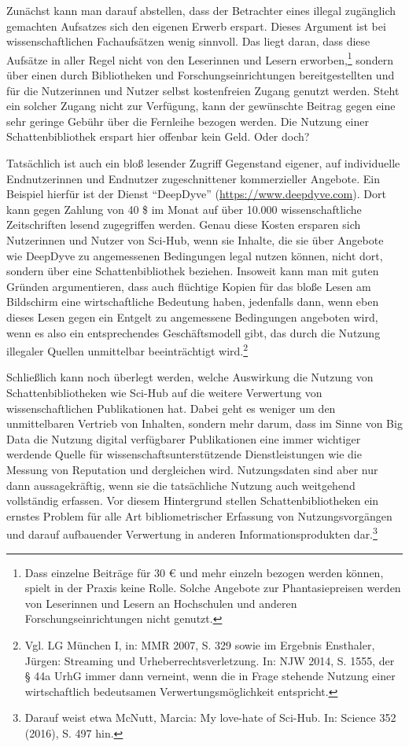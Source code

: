 \documentclass[a4paper,
fontsize=11pt,
oneside,
numbers=noperiodatend,
parskip=half-,
bibliography=totoc,
final
]{scrartcl}
\begin{document}
Zunächst kann man darauf abstellen, dass der Betrachter eines illegal
zugänglich gemachten Aufsatzes sich den eigenen Erwerb erspart. Dieses
Argument ist bei wissenschaftlichen Fachaufsätzen wenig sinnvoll. Das
liegt daran, dass diese Aufsätze in aller Regel nicht von den Leserinnen
und Lesern erworben,\footnote{Dass einzelne Beiträge für 30 \euro{} und
  mehr einzeln bezogen werden können, spielt in der Praxis keine Rolle.
  Solche Angebote zur Phantasiepreisen werden von Leserinnen und Lesern
  an Hochschulen und anderen Forschungseinrichtungen nicht genutzt.}
sondern über einen durch Bibliotheken und Forschungseinrichtungen
bereitgestellten und für die Nutzerinnen und Nutzer selbst kostenfreien
Zugang genutzt werden. Steht ein solcher Zugang nicht zur Verfügung,
kann der gewünschte Beitrag gegen eine sehr geringe Gebühr über die
Fernleihe bezogen werden. Die Nutzung einer Schattenbibliothek erspart
hier offenbar kein Geld. Oder doch?

Tatsächlich ist auch ein bloß lesender Zugriff Gegenstand eigener, auf
individuelle Endnutzerinnen und Endnutzer zugeschnittener kommerzieller
Angebote. Ein Beispiel hierfür ist der Dienst \enquote{DeepDyve}
(\url{https://www.deepdyve.com}). Dort kann gegen Zahlung von 40 \$ im
Monat auf über 10.000 wissenschaftliche Zeitschriften lesend zugegriffen
werden. Genau diese Kosten ersparen sich Nutzerinnen und Nutzer von
Sci-Hub, wenn sie Inhalte, die sie über Angebote wie DeepDyve zu
angemessenen Bedingungen legal nutzen können, nicht dort, sondern über
eine Schattenbibliothek beziehen. Insoweit kann man mit guten Gründen
argumentieren, dass auch flüchtige Kopien für das bloße Lesen am
Bildschirm eine wirtschaftliche Bedeutung haben, jedenfalls dann, wenn
eben dieses Lesen gegen ein Entgelt zu angemessene Bedingungen angeboten
wird, wenn es also ein entsprechendes Geschäftsmodell gibt, das durch
die Nutzung illegaler Quellen unmittelbar beeinträchtigt wird.\footnote{Vgl.
  LG München I, in: MMR 2007, S. 329 sowie im Ergebnis Ensthaler,
  Jürgen: Streaming und Urheberrechtsverletzung. In: NJW 2014, S. 1555,
  der § 44a UrhG immer dann verneint, wenn die in Frage stehende Nutzung
  einer wirtschaftlich bedeutsamen Verwertungsmöglichkeit entspricht.}

Schließlich kann noch überlegt werden, welche Auswirkung die Nutzung von
Schattenbibliotheken wie Sci-Hub auf die weitere Verwertung von
wissenschaftlichen Publikationen hat. Dabei geht es weniger um den
unmittelbaren Vertrieb von Inhalten, sondern mehr darum, dass im Sinne
von Big Data die Nutzung digital verfügbarer Publikationen eine immer
wichtiger werdende Quelle für wissenschaftsunterstützende
Dienstleistungen wie die Messung von Reputation und dergleichen wird.
Nutzungsdaten sind aber nur dann aussagekräftig, wenn sie die
tatsächliche Nutzung auch weitgehend vollständig erfassen. Vor diesem
Hintergrund stellen Schattenbibliotheken ein ernstes Problem für alle
Art bibliometrischer Erfassung von Nutzungsvorgängen und darauf
aufbauender Verwertung in anderen Informationsprodukten dar.\footnote{Darauf
  weist etwa McNutt, Marcia: My love-hate of Sci-Hub. In: Science 352
  (2016), S. 497 hin.}
\end{document}
